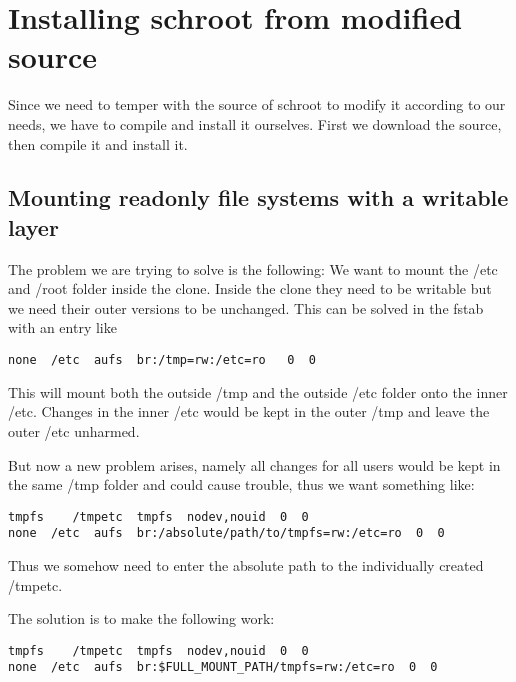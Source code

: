 \documentclass[a4paper]{book}
\begin{document}
\section{Installing schroot from modified source}
Since we need to temper with the source of schroot to modify it according to our needs, we have to compile and install it ourselves. First we download the source, then compile it and install it.

\subsection{Mounting readonly file systems with a writable layer}
The problem we are trying to solve is the following: We want to mount the /etc
and /root folder inside the clone. Inside the clone they need to be writable
but we need their outer versions to be unchanged.  This can be solved in the
fstab with an entry like

\begin{verbatim}
none  /etc  aufs  br:/tmp=rw:/etc=ro   0  0
\end{verbatim}

This will mount both the outside /tmp and the outside /etc folder onto the
inner /etc. Changes in the inner /etc would be kept in the outer /tmp and leave
the outer /etc unharmed.

But now a new problem arises, namely all changes for all users would be kept in
the same /tmp folder and could cause trouble, thus we want something like:

\begin{verbatim}
tmpfs    /tmpetc  tmpfs  nodev,nouid  0  0
none  /etc  aufs  br:/absolute/path/to/tmpfs=rw:/etc=ro  0  0
\end{verbatim}

Thus we somehow need to enter the absolute path to the individually created /tmpetc.

The solution is to make the following work:

\begin{verbatim}
tmpfs    /tmpetc  tmpfs  nodev,nouid  0  0
none  /etc  aufs  br:$FULL_MOUNT_PATH/tmpfs=rw:/etc=ro  0  0
\end{verbatim}
\end{document}
